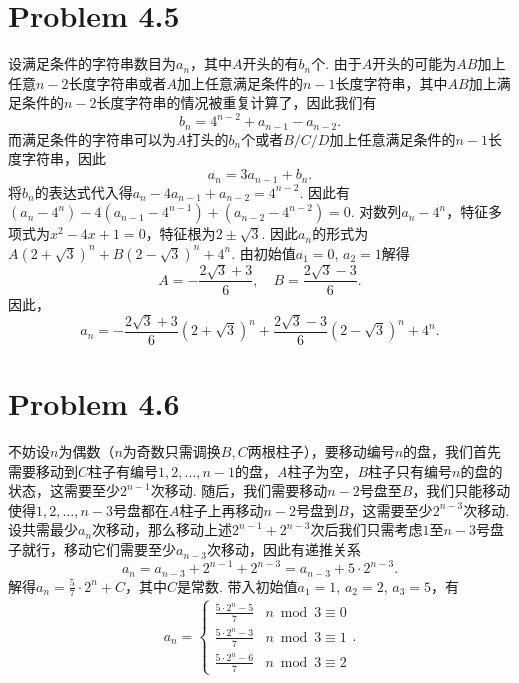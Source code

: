 \documentclass{article}
\begin{document}
\section*{Problem 4.5}
设满足条件的字符串数目为$a_n$，其中$A$开头的有$b_n$个. 由于$A$开头的可能为$AB$加上任意$n-2$长度字符串或者$A$加上任意满足条件的$n-1$长度字符串，其中$AB$加上满足条件的$n-2$长度字符串的情况被重复计算了，因此我们有
\[b_n=4^{n-2}+a_{n-1}-a_{n-2}.\]
而满足条件的字符串可以为$A$打头的$b_n$个或者$B/C/D$加上任意满足条件的$n-1$长度字符串，因此
\[a_n=3a_{n-1}+b_n.\]
将$b_n$的表达式代入得$a_n-4a_{n-1}+a_{n-2}=4^{n-2}$.
因此有$(a_n-4^n)-4(a_{n-1}-4^{n-1})+(a_{n-2}-4^{n-2})=0$.
对数列$a_n-4^n$，特征多项式为$x^2-4x+1=0$，特征根为$2\pm\sqrt{3}$. 因此$a_n$的形式为$A(2+\sqrt{3})^n+B(2-\sqrt{3})^n+4^n$. 由初始值$a_1=0$, $a_2=1$解得
\[A=-\dfrac{2\sqrt{3}+3}{6},\quad B=\dfrac{2\sqrt{3}-3}{6}.\]
因此，
\[a_n=-\dfrac{2\sqrt{3}+3}{6}(2+\sqrt{3})^n+\dfrac{2\sqrt{3}-3}{6}(2-\sqrt{3})^n+4^n.\]



\section*{Problem 4.6}
不妨设$n$为偶数（$n$为奇数只需调换$B,C$两根柱子），要移动编号$n$的盘，我们首先需要移动到$C$柱子有编号$1,2,\dots,n-1$的盘，$A$柱子为空，$B$柱子只有编号$n$的盘的状态，这需要至少$2^{n-1}$次移动. 随后，我们需要移动$n-2$号盘至$B$，我们只能移动使得$1,2,\dots,n-3$号盘都在$A$柱子上再移动$n-2$号盘到$B$，这需要至少$2^{n-3}$次移动. 设共需最少$a_n$次移动，那么移动上述$2^{n-1}+2^{n-3}$次后我们只需考虑$1$至$n-3$号盘子就行，移动它们需要至少$a_{n-3}$次移动，因此有递推关系
\[a_n=a_{n-3}+2^{n-1}+2^{n-3}=a_{n-3}+5\cdot 2^{n-3}.\]
解得$a_n=\frac{5}{7}\cdot 2^n+C$，其中$C$是常数. 带入初始值$a_1=1$, $a_2=2$, $a_3=5$，有
\begin{align*}
    a_n =
    \begin{cases}
    \frac{5\cdot 2^n-5}{7} & n\bmod 3\equiv 0 \\
    \frac{5\cdot 2^n-3}{7} & n\bmod 3\equiv 1 \\
    \frac{5\cdot 2^n-6}{7} & n\bmod 3\equiv 2
    \end{cases}.
\end{align*}
\end{document}
